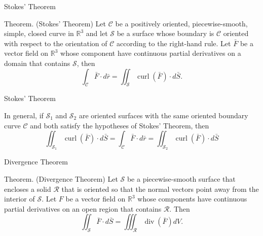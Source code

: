 \documentclass{beamer}
\begin{document}
\begin{frame}{Stokes' Theorem}
        \par \textcolor{yy}{Theorem. (Stokes' Theorem)} Let $\mathcal{C}$ be a positively oriented, piecewise-smooth, simple, closed curve in $\mathbb{R}^3$ and let $\mathcal{S}$ be a surface whose boundary is $\mathcal{C}$ oriented with respect to the orientation of $\mathcal{C}$ according to the right-hand rule. Let $\bar{F}$ be a vector field on $\mathbb{R}^3$ whose component have continuous partial derivatives on a domain that contains $\mathcal{S}$, then 
        \begin{equation*}
            \int_{\mathcal{C}} \bar{F} \cdot d \bar{r} = \iint_{\mathcal{S}} \operatorname{curl}(\bar{F}) \cdot d \bar{S}.
        \end{equation*}
    \end{frame}



    \begin{frame}{Stokes' Theorem}
        \par In general, if $\mathcal{S}_1$ and $\mathcal{S}_2$ are oriented surfaces with the same oriented boundary curve $\mathcal{C}$ and both satisfy the hypotheses of Stokes' Theorem, then 
        \begin{equation*}
            \iint_{\mathcal{S}_1} \operatorname{curl}(\bar{F}) \cdot d \bar{S} = \int_{\mathcal{C}} \bar{F} \cdot d \bar{r} = \iint_{\mathcal{S}_2} \operatorname{curl}(\bar{F}) \cdot d \bar{S}
        \end{equation*}
    \end{frame}

    \begin{frame}{Divergence Theorem}
        \par \textcolor{yy}{Theorem. (Divergence Theorem)} Let $\mathcal{S}$ be a piecewise-smooth surface that encloses a solid $\mathcal{R}$ that is oriented so that the normal vectors point away from the interior of $\mathcal{S}$. Let $F$ be a vector field on $\mathbb{R}^3$ whose components have continuous partial derivatives on an open region that contains $\mathcal{R}$. Then 
        \begin{equation*}
            \iint_{\mathcal{S}} \bar{F} \cdot d\bar{S} = \iiint_{\mathcal{R}} \operatorname{div}(\bar{F}) dV.
        \end{equation*}
    \end{frame}
\end{document}
